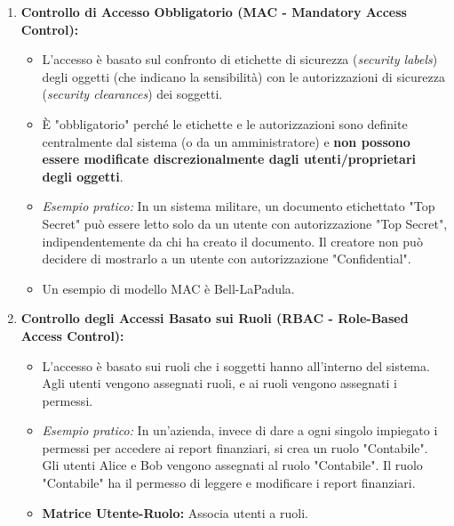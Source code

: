 \documentclass{article}
\begin{document}
\begin{enumerate}
    \item \textbf{Controllo di Accesso Obbligatorio (MAC - Mandatory Access Control):}
    \begin{itemize}
        \item L'accesso è basato sul confronto di etichette di sicurezza (\textit{security labels}) degli oggetti (che indicano la sensibilità) con le autorizzazioni di sicurezza (\textit{security clearances}) dei soggetti.
        \item È "obbligatorio" perché le etichette e le autorizzazioni sono definite centralmente dal sistema (o da un amministratore) e \textbf{non possono essere modificate discrezionalmente dagli utenti/proprietari degli oggetti}.
        \item \textit{Esempio pratico:} In un sistema militare, un documento etichettato "Top Secret" può essere letto solo da un utente con autorizzazione "Top Secret", indipendentemente da chi ha creato il documento. Il creatore non può decidere di mostrarlo a un utente con autorizzazione "Confidential".
        \item Un esempio di modello MAC è Bell-LaPadula.
    \end{itemize}

    \item \textbf{Controllo degli Accessi Basato sui Ruoli (RBAC - Role-Based Access Control):}
    \begin{itemize}
        \item L'accesso è basato sui ruoli che i soggetti hanno all'interno del sistema. Agli utenti vengono assegnati ruoli, e ai ruoli vengono assegnati i permessi.
        \item \textit{Esempio pratico:} In un'azienda, invece di dare a ogni singolo impiegato i permessi per accedere ai report finanziari, si crea un ruolo "Contabile". Gli utenti Alice e Bob vengono assegnati al ruolo "Contabile". Il ruolo "Contabile" ha il permesso di leggere e modificare i report finanziari.
        \item \textbf{Matrice Utente-Ruolo:} Associa utenti a ruoli.
        \begin{figure}[H]
        \centering
\end{figure}
\end{itemize}
\end{enumerate}
\end{document}
